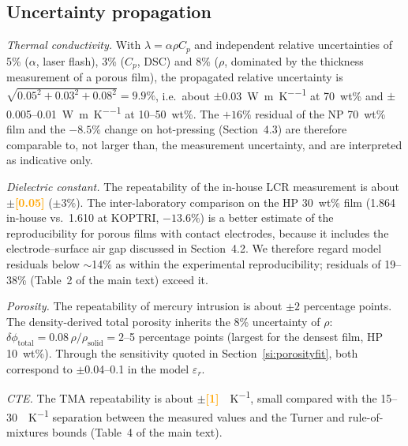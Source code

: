 \documentclass[10pt,a4paper]{article}
\newcommand{\hl}[1]{\textcolor{orange}{\textbf{[#1]}}}
\newcommand{\eps}{\ensuremath{\varepsilon_r}}
\newcommand{\lam}{\ensuremath{\lambda}}
\begin{document}
\subsection{Uncertainty propagation}
\label{si:uncertainty}
\emph{Thermal conductivity.} With $\lam = \alpha\rho C_p$ and independent relative uncertainties of 5\% ($\alpha$, laser flash), 3\% ($C_p$, DSC) and 8\% ($\rho$, dominated by the thickness measurement of a porous film), the propagated relative uncertainty is $\sqrt{0.05^2 + 0.03^2 + 0.08^2} = 9.9\%$, i.e.\ about $\pm$\SI{0.03}{\watt\per\meter\per\kelvin} at 70~wt\% and $\pm$0.005--\SI{0.01}{\watt\per\meter\per\kelvin} at 10--50~wt\%. The $+16\%$ residual of the NP 70~wt\% film and the $-8.5\%$ change on hot-pressing (Section~4.3) are therefore comparable to, not larger than, the measurement uncertainty, and are interpreted as indicative only.

\emph{Dielectric constant.} The repeatability of the in-house LCR measurement is about $\pm$\hl{0.05} ($\pm 3\%$). The inter-laboratory comparison on the HP 30~wt\% film (1.864 in-house vs.\ 1.610 at KOPTRI, $-13.6\%$) is a better estimate of the reproducibility for porous films with contact electrodes, because it includes the electrode--surface air gap discussed in Section~4.2. We therefore regard model residuals below $\sim$14\% as within the experimental reproducibility; residuals of 19--38\% (Table~2 of the main text) exceed it.

\emph{Porosity.} The repeatability of mercury intrusion is about $\pm 2$ percentage points. The density-derived total porosity inherits the 8\% uncertainty of $\rho$: $\delta\phi_{\mathrm{total}} = 0.08\,\rho/\rho_{\mathrm{solid}} = 2$--5 percentage points (largest for the densest film, HP 10~wt\%). Through the sensitivity quoted in Section~\ref{si:porosityfit}, both correspond to $\pm$0.04--0.1 in the model \eps.

\emph{CTE.} The TMA repeatability is about $\pm$\hl{1}~\si{\ppm\per\kelvin}, small compared with the 15--30~\si{\ppm\per\kelvin} separation between the measured values and the Turner and rule-of-mixtures bounds (Table~4 of the main text).
\end{document}
